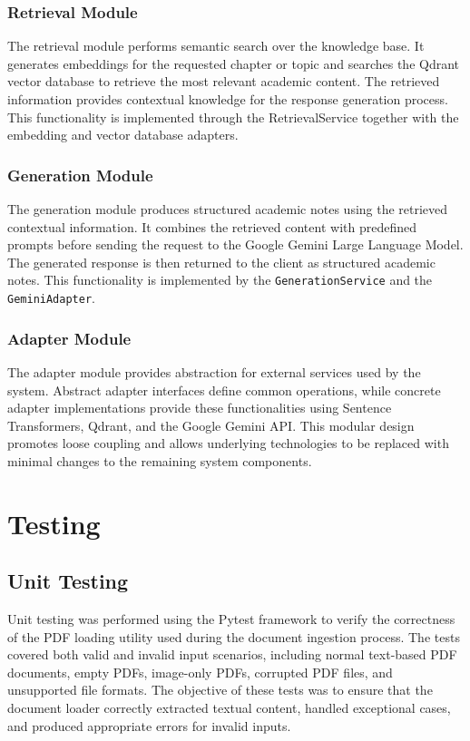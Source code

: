\subsubsection{Retrieval Module}
The retrieval module performs semantic search over the knowledge base. It generates embeddings for the requested chapter or topic and searches the Qdrant vector database to retrieve the most relevant academic content. The retrieved information provides contextual knowledge for the response generation process. This functionality is implemented through the RetrievalService together with the embedding and vector database adapters. \par

\subsubsection{Generation Module}
The generation module produces structured academic notes using the retrieved contextual information. It combines the retrieved content with predefined prompts before sending the request to the Google Gemini Large Language Model. The generated response is then returned to the client as structured academic notes. This functionality is implemented by the \texttt{GenerationService} and the \texttt{GeminiAdapter}. \par

\subsubsection{Adapter Module}
The adapter module provides abstraction for external services used by the system. Abstract adapter interfaces define common operations, while concrete adapter implementations provide these functionalities using Sentence Transformers, Qdrant, and the Google Gemini API. This modular design promotes loose coupling and allows underlying technologies to be replaced with minimal changes to the remaining system components.

\section{Testing}
\subsection{Unit Testing}
Unit testing was performed using the Pytest framework to verify the correctness of the PDF loading utility used during the document ingestion process. The tests covered both valid and invalid input scenarios, including normal text-based PDF documents, empty PDFs, image-only PDFs, corrupted PDF files, and unsupported file formats. The objective of these tests was to ensure that the document loader correctly extracted textual content, handled exceptional cases, and produced appropriate errors for invalid inputs. \par

